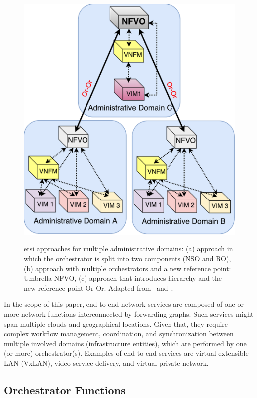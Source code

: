 \begin{figure}[t!]
{   \includegraphics[scale=.31]{Figures/03_NSO/mdo_etsi_3} 
   \label{fig:use3}
 }
 \caption{\gls{etsi} approaches for multiple administrative domains: (a) approach in which the orchestrator is split into two components (NSO and RO), (b) approach with multiple orchestrators and a new reference point: Umbrella NFVO, (c) approach that introduces hierarchy and the new reference point Or-Or. Adapted from~\cite{ETSIIndustrySpecificationGroupISGNFV2014NetworkOptions} and~\cite{ETSIGRDomains}.}
 \label{fig:k-clique}  
\end{figure}

In the scope of this paper, end-to-end network services are composed of one or more network functions interconnected by forwarding graphs. Such services might span multiple clouds and geographical locations. Given that, they require complex workflow management, coordination, and synchronization between multiple involved domains (infrastructure entities), which are performed by one (or more) orchestrator(s). Examples of end-to-end services are virtual extensible LAN (VxLAN), video service delivery, and virtual private network.

\subsection{Orchestrator Functions}
\label{subsec:func}


